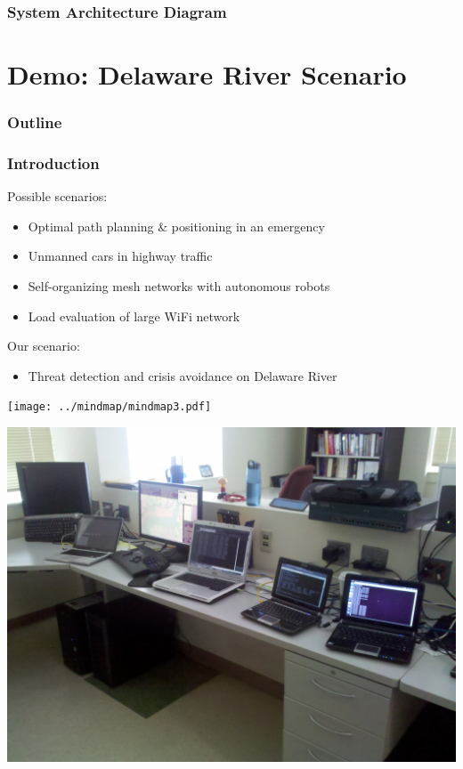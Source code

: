 \documentclass[mathserif,usenames,dvipsnames]{beamer}
\begin{document}
\frame
{
    \frametitle{System Architecture Diagram}
    \begin{center}
    \begin{figure}
        \resizebox{0.8\textwidth}{!}{}
    \end{figure}
    \end{center}
}


\section{Demo: Delaware River Scenario}
\frame
{
    \frametitle{Outline}
    \tableofcontents
}

\frame
{
    \frametitle{Introduction}
    Possible scenarios:
    \begin{itemize}
        \item Optimal path planning \& positioning in an emergency
        \item Unmanned cars in highway traffic
        \item Self-organizing mesh networks with autonomous robots
        \item Load evaluation of large WiFi network
    \end{itemize}
    Our scenario:
    \begin{itemize}
        \item Threat detection and crisis avoidance on Delaware River
    \end{itemize} 
}

\frame
{
    \begin{center}
        \texttt{[image: ../mindmap/mindmap3.pdf]}
    \end{center}
}
\frame
{
    \begin{center}
        \includegraphics[scale=.1]{images/testbed.jpg}
    \end{center}
}
\end{document}
